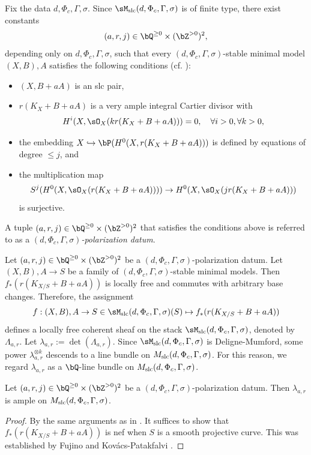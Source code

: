 \documentclass[11pt,letterpaper]{amsart}
\numberwithin{equation}{section}
\begin{document}
	Fix the data $d, \Phi_c, \Gamma, \sigma$. Since $\sM_{\rm slc}(d, \Phi_c, \Gamma, \sigma)$ is of finite type, there exist constants  
	$$
	(a, r, j) \in \bQ^{\geq 0} \times (\bZ^{>0})^2,
	$$  
	depending only on $d, \Phi_c, \Gamma, \sigma$, such that every $(d, \Phi_c, \Gamma, \sigma)$-stable minimal model $(X, B), A$ satisfies the following conditions (cf. \cite[Lemma 10.2]{Birkar2022}):  
	\begin{itemize}  
		\item $(X, B + aA)$ is an slc pair,  
		\item $r(K_X + B + aA)$ is a very ample integral Cartier divisor with  
		$$
		H^i(X, \sO_X(k r(K_X + B + aA))) = 0, \quad \forall i > 0, \forall k > 0,  
		$$  
		\item the embedding $X \hookrightarrow \bP(H^0(X, r(K_X + B + aA)))$ is defined by equations of degree $\leq j$, and  
		\item the multiplication map  
		$$
		S^j(H^0(X, \sO_X(r(K_X + B + aA)))) \to H^0(X, \sO_X(j r(K_X + B + aA)))
		$$  
		is surjective.  
	\end{itemize}
	\begin{defn}
		A tuple $(a, r, j) \in \bQ^{\geq 0} \times (\bZ^{>0})^2$ that satisfies the conditions above is referred to as a \emph{$(d, \Phi_c, \Gamma, \sigma)$-polarization datum}.
	\end{defn}
	Let $(a, r, j) \in \bQ^{\geq 0} \times (\bZ^{>0})^2$ be a $(d, \Phi_c, \Gamma, \sigma)$-polarization datum. Let $(X, B), A \to S$ be a family of $(d, \Phi_c, \Gamma, \sigma)$-stable minimal models. Then $f_\ast(r(K_{X/S} + B + aA))$ is locally free and commutes with arbitrary base changes. Therefore, the assignment  
	$$
	f: (X, B), A \to S \in \sM_{\rm slc}(d, \Phi_c, \Gamma, \sigma)(S) \mapsto f_\ast(r(K_{X/S} + B + aA))
	$$  
	defines a locally free coherent sheaf on the stack $\sM_{\rm slc}(d, \Phi_c, \Gamma, \sigma)$, denoted by $\Lambda_{a,r}$. Let $\lambda_{a,r} := \det(\Lambda_{a,r})$. Since $\sM_{\rm slc}(d, \Phi_c, \Gamma, \sigma)$ is Deligne-Mumford, some power $\lambda_{a,r}^{\otimes k}$ descends to a line bundle on $M_{\rm slc}(d, \Phi_c, \Gamma, \sigma)$. For this reason, we regard $\lambda_{a,r}$ as a $\bQ$-line bundle on $M_{\rm slc}(d, \Phi_c, \Gamma, \sigma)$.
	\begin{prop}\label{prop_ample_line_bundle_moduli}  
		Let $(a, r, j) \in \bQ^{\geq 0} \times (\bZ^{>0})^2$ be a $(d, \Phi_c, \Gamma, \sigma)$-polarization datum. Then $\lambda_{a,r}$ is ample on $M_{\rm slc}(d, \Phi_c, \Gamma, \sigma)$.  
	\end{prop}  	
	\begin{proof}  
		By the same arguments as in \cite[\S 2.9]{Kollar1990}. It suffices to show that $f_\ast(r(K_{X/S} + B + aA))$ is nef when $S$ is a smooth projective curve. This was established by Fujino \cite{Fujino2018} and Kov\'acs-Patakfalvi \cite{Kovacs2017}.  
	\end{proof}  
\end{document}
